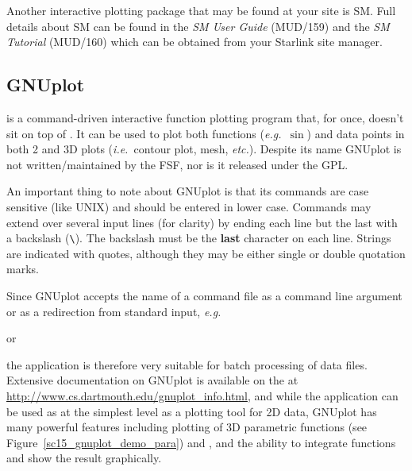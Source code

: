 \documentclass[twoside,11pt]{starlink}
\begin{document}
Another interactive plotting package that may be found at your site is
SM. Full details about SM can be found in the \emph{SM User Guide}
(MUD/159) and the \emph{SM Tutorial} (MUD/160) which can be obtained
from your Starlink site manager.

\subsection{GNUplot\label{sc15_gnuplot}}

is a command-driven interactive function plotting program that, for
once, doesn't sit on top of . It can be
used to plot both functions (\emph{e.g.\ }$\sin$) and data points in
both 2 and 3D plots (\emph{i.e.\ }contour plot, mesh, \emph{etc.}).
Despite its name GNUplot is not written/maintained by the FSF, nor is
it released under the GPL.

An important thing to note about GNUplot is that its commands are case
sensitive (like UNIX) and should be entered in lower case. Commands
may extend over several input lines (for clarity) by ending each line
but the last with a backslash (\verb+\+). The backslash must be the
\textbf{last} character on each line. Strings are indicated with quotes,
although they may be either single or double quotation marks.

Since GNUplot accepts the name of a command file as a command line
argument or as a redirection from standard input, \emph{e.g.\ }

\begin{terminalv}
\end{terminalv}

or

\begin{terminalv}
\end{terminalv}

the application is therefore very suitable for batch processing of
data files. Extensive documentation on GNUplot is available on the
at \url{http://www.cs.dartmouth.edu/gnuplot_info.html}, and while
the application can be used as at the simplest level as a plotting
tool for 2D data, GNUplot has many powerful features including
plotting of 3D parametric functions (see
Figure~\ref{sc15_gnuplot_demo_para}) and
, and the ability to integrate
functions and show the result graphically.
\end{document}
